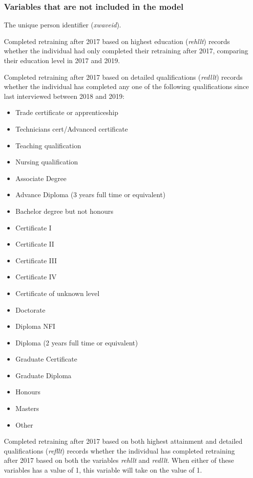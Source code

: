 \documentclass[12pt, a4paper]{article}
\begin{document}
\subsubsection{Variables that are not included in the model}

The unique person identifier (\textit{xwaveid}).

Completed retraining after 2017 based on highest education (\textit{rehllt}) records whether the individual had only completed their retraining after 2017, comparing their education level in 2017 and 2019.

Completed retraining after 2017 based on detailed qualifications (\textit{redllt}) records whether the individual has completed any one of the following qualifications since last interviewed between 2018 and 2019:

\begin{itemize}
  \item Trade certificate or apprenticeship
  \item Technicians cert/Advanced certificate
  \item Teaching qualification 
  \item Nursing qualification 
  \item Associate Degree
  \item Advance Diploma (3 years full time or equivalent)
  \item Bachelor degree but not honours
  \item Certificate I
  \item Certificate II
  \item Certificate III
  \item Certificate IV
  \item Certificate of unknown level
  \item Doctorate
  \item Diploma NFI
  \item Diploma (2 years full time or equivalent)
  \item Graduate Certificate
  \item Graduate Diploma 
  \item Honours 
  \item Masters 
  \item Other 
\end{itemize}  
  
Completed retraining after 2017 based on both highest attainment and detailed qualifications (\textit{refllt}) records whether the individual has completed retraining after 2017 based on both the variables \textit{rehllt} and \textit{redllt}. When either of these variables has a value of 1, this variable will take on the value of 1. 
\end{document}
